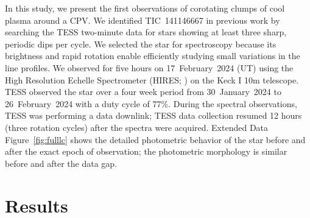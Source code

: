 \documentclass{nature3}
\begin{document}
In this study, we present the first observations of corotating clumps of
cool plasma around a CPV.  We identified TIC~141146667 in previous work
\cite{Bouma2024} by searching the TESS two-minute data \cite{Ricker2015}
for stars showing at least three sharp, periodic dips per cycle.  We
selected the star for spectroscopy because its brightness and rapid
rotation enable efficiently studying small variations in the line profiles.  We
observed for five hours on 17~February~2024 (UT) using the High
Resolution Echelle Spectrometer (HIRES; \cite{vogt_hires_1994}) on the
Keck I 10m telescope.  TESS observed the star over a four week period
from 30~January~2024 to 26~February~2024 with a duty cycle of 77\%.
During the spectral observations, TESS was performing a data downlink;
TESS data collection resumed 12 hours (three rotation cycles) after the
spectra were acquired.  Extended Data Figure~\ref{fig:fulllc} shows the
detailed photometric behavior of the star before and after the exact
epoch of observation; the photometric morphology is similar before and
after the data gap.


\section{Results}
\end{document}
